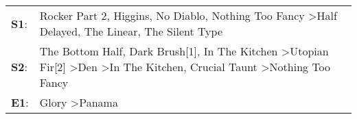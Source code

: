 \begin{supertabular}{p{0.03\textwidth}p{0.92\textwidth}}
 \textbf{S1}:  &                                                                                       Rocker Part 2\textsuperscript{}, \enspace Higgins\textsuperscript{}, \enspace No Diablo\textsuperscript{}, \enspace Nothing Too Fancy\textsuperscript{} \textgreater \enspace Half Delayed\textsuperscript{}, \enspace The Linear\textsuperscript{}, \enspace The Silent Type\textsuperscript{}  \enspace  \\
 \textbf{S2}:  &  The Bottom Half\textsuperscript{}, \enspace Dark Brush[1]\textsuperscript{}, \enspace In The Kitchen\textsuperscript{} \textgreater \enspace Utopian Fir[2]\textsuperscript{} \textgreater \enspace Den\textsuperscript{} \textgreater \enspace In The Kitchen\textsuperscript{}, \enspace Crucial Taunt\textsuperscript{} \textgreater \enspace Nothing Too Fancy\textsuperscript{}  \enspace  \\
 \textbf{E1}:  &                                                                                                                                                                                                                                                                                                                Glory\textsuperscript{} \textgreater \enspace Panama\textsuperscript{}  \enspace  \\
\end{supertabular}
